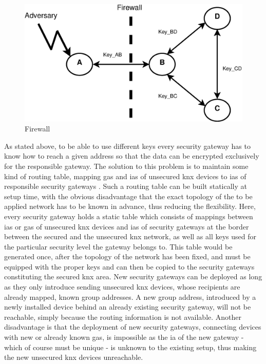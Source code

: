 \begin{figure}
  \centering
    \includegraphics[width=1\textwidth]{figures/firewall.eps}
 \caption{Firewall}
 \label{fig:firewall}
\end{figure}
As stated above, to be able to use different keys every security gateway has to know how to reach a given address so that the data can be encrypted
exclusively for the responsible gateway. The solution to this problem is to maintain some kind of routing table, mapping \glspl{ga} and \glspl{ia} of unsecured
\gls{knx} devices to \glspl{ia} of responsible security gateways	.
Such a routing table can be built statically at setup time, with the obvious disadvantage
that the exact topology of the to be applied network has to be known in advance, thus reducing the flexibility. Here, every security gateway holds a static 
table which consists of mappings between \glspl{ia} or \glspl{ga} of unsecured \gls{knx} devices and \glspl{ia} of security gateways at the border
between the secured and the unsecured \gls{knx} network, as well as all keys used for the particular security level the gateway belongs to.
This table would be generated once, after the topology of the network has been fixed, and must be equipped with the proper keys and can then
be copied to the security gateways constituting the secured \gls{knx} area. New security gateways can be deployed as long as they only introduce sending 
unsecured \gls{knx} devices, whose recipients are already mapped, known group addresses. A new group address, introduced by a newly installed device behind
an already existing security gateway, will not be reachable, simply because the routing information is not available. 
Another disadvantage is that the deployment of new
security gateways, connecting devices with new or already known \glspl{ga}, is impossible as the \gls{ia} of the new gateway - which of
course must be unique - is unknown to the existing setup, thus making the new unsecured \gls{knx} devices unreachable.

